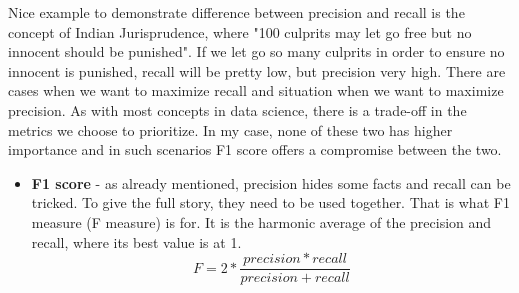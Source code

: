 Nice example to demonstrate difference between precision and recall is the concept of Indian Jurisprudence, where "100 culprits may let go free but no innocent should be punished". If we let go so many culprits in order to ensure no innocent is punished, recall will be pretty low, but precision very high. There are cases when we want to maximize recall and situation when we want to maximize precision. As with most concepts in data science, there is a trade-off in the metrics we choose to prioritize. In my case, none of these two has higher importance and in such scenarios F1 score offers a compromise between the two.
\begin{itemize}
\item \textbf{F1 score} - as already mentioned, precision hides some facts and recall can be tricked. To give the full story, they need to be used together. That is what F1 measure (F measure) is for. It is the harmonic average of the precision and recall, where its best value is at 1.
\[ F = 2 * \frac{precision * recall}{precision + recall}\]
\end{itemize}